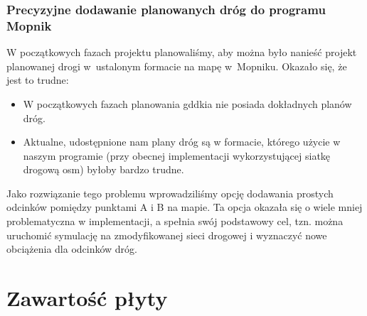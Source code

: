 \subsection{Precyzyjne dodawanie planowanych dróg do programu Mopnik}
W początkowych fazach projektu planowaliśmy, aby można było nanieść projekt planowanej drogi w~ustalonym formacie na mapę w~Mopniku. Okazało się, że jest to trudne:
\begin{itemize}
\item W początkowych fazach planowania \acrshort{gddkia} nie posiada dokładnych planów dróg.
\item Aktualne, udostępnione nam plany dróg są w formacie, którego użycie w naszym programie (przy obecnej implementacji wykorzystującej siatkę drogową \acrshort{osm}) byłoby bardzo trudne.
\end{itemize}
Jako rozwiązanie tego problemu wprowadziliśmy opcję dodawania prostych odcinków pomiędzy punktami A i B na mapie. Ta opcja okazała się o wiele mniej problematyczna w implementacji, a spełnia swój podstawowy cel, tzn. można uruchomić symulację na zmodyfikowanej sieci drogowej i wyznaczyć nowe obciążenia dla odcinków dróg.

\chapter{Zawartość płyty}


